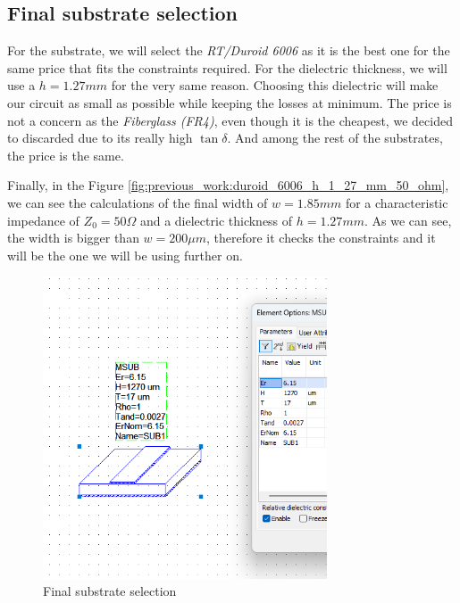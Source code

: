 \documentclass[12pt]{report} %
\begin{document}
\subsection{Final substrate selection}

For the substrate, we will select the \textit{RT/Duroid 6006} as it is the best one for the same price that fits the constraints required. For the dielectric thickness, we will use a $h = 1.27 mm$ for the very same reason. Choosing this dielectric will make our circuit as small as possible while keeping the losses at minimum. The price is not a concern as the \textit{Fiberglass (FR4)}, even though it is the cheapest, we decided to discarded due to its really high $\tan \delta$. And among the rest of the substrates, the price is the same.

Finally, in the Figure \ref{fig:previous_work:duroid_6006_h_1_27_mm_50_ohm}, we can see the calculations of the final width of $w = 1.85 mm$ for a characteristic impedance of $Z_{0} = 50 \Omega$ and a dielectric thickness of $h = 1.27 mm$. As we can see, the width is bigger than $w = 200 \mu m$, therefore it checks the constraints and it will be the one we will be using further on.

\begin{figure}[htbp]
    \centering
    \includegraphics[width=0.75\textwidth]{images/previous_work/final_substrate_duroid_6006_h_1_27_mm.png}
    \caption{Final substrate selection}
    \label{fig:previous_work:final_substrate}
\end{figure}
\end{document}
